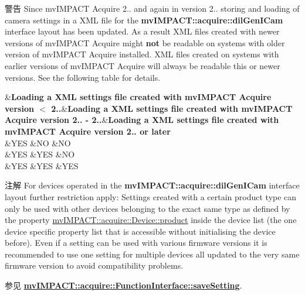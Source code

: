 \begin{DoxyWarning}{警告}
Since mv\+I\+M\+P\+A\+C\+T Acquire 2.. and again in version 2.. storing and loading of camera settings in a X\+M\+L file for the {\bfseries mv\+I\+M\+P\+A\+C\+T\+::acquire\+::dil\+Gen\+I\+Cam} interface layout has been updated. As a result X\+M\+L files created with newer versions of mv\+I\+M\+P\+A\+C\+T Acquire might {\bfseries not} be readable on systems with older version of mv\+I\+M\+P\+A\+C\+T Acquire installed. X\+M\+L files created on systems with earlier versions of mv\+I\+M\+P\+A\+C\+T Acquire will always be readable this or newer versions. See the following table for details. \begin{TabularC}{4}
\hline
{}&{\bf Loading a X\+M\+L settings file created with mv\+I\+M\+P\+A\+C\+T Acquire version $<$ 2..}&{\bf Loading a X\+M\+L settings file created with mv\+I\+M\+P\+A\+C\+T Acquire version 2.. -\/ 2..}&{\bf Loading a X\+M\+L settings file created with mv\+I\+M\+P\+A\+C\+T Acquire version 2.. or later }\\
&Y\+E\+S &N\+O &N\+O \\
&Y\+E\+S &Y\+E\+S &N\+O \\
&Y\+E\+S &Y\+E\+S &Y\+E\+S \\
\end{TabularC}

\end{DoxyWarning}
\begin{DoxyNote}{注解}
For devices operated in the {\bfseries mv\+I\+M\+P\+A\+C\+T\+::acquire\+::dil\+Gen\+I\+Cam} interface layout further restriction apply\+: Settings created with a certain product type can only be used with other devices belonging to the exact same type as defined by the property \hyperlink{classmv_i_m_p_a_c_t_1_1acquire_1_1_device_af37787e344732926a99103df8faf05be}{mv\+I\+M\+P\+A\+C\+T\+::acquire\+::\+Device\+::product} inside the device list (the one device specific property list that is accessible without initialising the device before). Even if a setting can be used with various firmware versions it is recommended to use one setting for multiple devices all updated to the very same firmware version to avoid compatibility problems.
\end{DoxyNote}
\begin{DoxySeeAlso}{参见}
{\bfseries \hyperlink{classmv_i_m_p_a_c_t_1_1acquire_1_1_function_interface_af58882e7db1d92551f83ca39f4d6516d}{mv\+I\+M\+P\+A\+C\+T\+::acquire\+::\+Function\+Interface\+::save\+Setting}}. 
\end{DoxySeeAlso}
